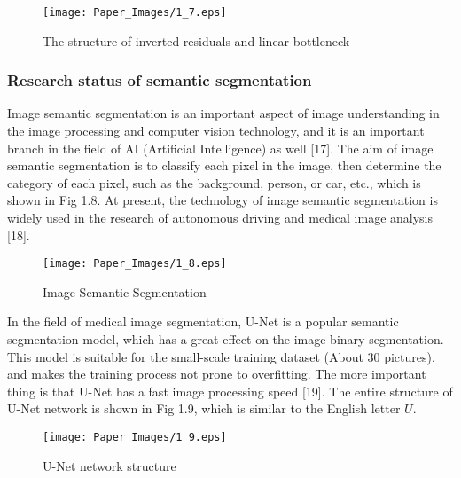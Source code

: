 \documentclass[22pt, UTF8]{article}
\numberwithin{figure}{section}
\numberwithin{table}{section}
\numberwithin{equation}{section} %
\begin{document}
\begin{figure}[htbp]
    \begin{center}
        \texttt{[image: Paper\_Images/1\_7.eps]}
    \end{center}
    \vspace{-3mm} %
    \caption{The structure of inverted residuals and linear bottleneck}
    \vspace{-4mm} %
\end{figure}

\subsubsection{Research status of semantic segmentation}

\setlength\parindent{2em} Image semantic segmentation is an important aspect of image understanding in the image processing and computer vision technology, and it is an important branch in the field of AI (Artificial Intelligence) as well [17]. The aim of image semantic segmentation is to classify each pixel in the image, then determine the category of each pixel, such as the background, person, or car, etc., which is shown in Fig 1.8. At present, the technology of image semantic segmentation is widely used in the research of autonomous driving and medical image analysis [18].

\begin{figure}[htbp]
    \begin{center}
        \texttt{[image: Paper\_Images/1\_8.eps]}
    \end{center}
    \vspace{-3mm} %
    \caption{Image Semantic Segmentation}
    \vspace{-4mm} %
\end{figure}

\setlength\parindent{2em} In the field of medical image segmentation, U-Net is a popular semantic segmentation model, which has a great effect on the image binary segmentation. This model is suitable for the small-scale training dataset (About 30 pictures), and makes the training process not prone to overfitting. The more important thing is that U-Net has a fast image processing speed [19]. The entire structure of U-Net network is shown in Fig 1.9, which is similar to the English letter $U$.

\begin{figure}[htbp]
    \begin{center}
        \texttt{[image: Paper\_Images/1\_9.eps]}
    \end{center}
    \vspace{-3mm} %
    \caption{U-Net network structure}
    \vspace{-4mm} %
\end{figure}
\end{document}
